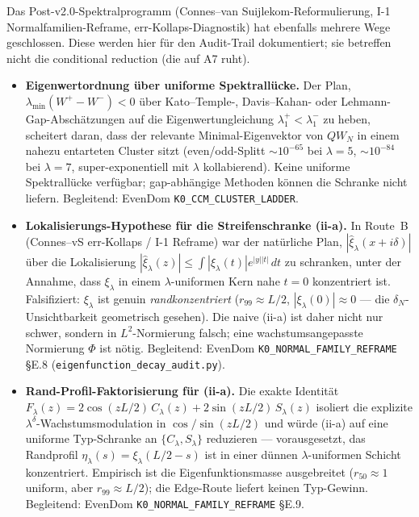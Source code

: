 \documentclass[12pt,a4paper]{article}
\theoremstyle{definition}
\theoremstyle{remark}
\begin{document}
Das Post-v2.0-Spektralprogramm (Connes--van Suijlekom-Reformulierung, I-1 Normalfamilien-Reframe, err-Kollaps-Diagnostik) hat ebenfalls mehrere Wege geschlossen. Diese werden hier für den Audit-Trail dokumentiert; sie betreffen nicht die conditional reduction (die auf A7 ruht).

\begin{itemize}
  \item \textbf{Eigenwertordnung über uniforme Spektrallücke.} Der Plan, $\lambda_{\min}(W^+-W^-)<0$ über Kato--Temple-, Davis--Kahan- oder Lehmann-Gap-Abschätzungen auf die Eigenwertungleichung $\lambda_1^+<\lambda_1^-$ zu heben, scheitert daran, dass der relevante Minimal-Eigenvektor von $QW_N$ in einem nahezu entarteten Cluster sitzt (even/odd-Splitt $\sim\!10^{-65}$ bei $\lambda=5$, $\sim\!10^{-84}$ bei $\lambda=7$, super-exponentiell mit $\lambda$ kollabierend). Keine uniforme Spektrallücke verfügbar; gap-abhängige Methoden können die Schranke nicht liefern. Begleitend: EvenDom \texttt{K0\_CCM\_CLUSTER\_LADDER}.

  \item \textbf{Lokalisierungs-Hypothese für die Streifenschranke (ii-a).} In Route~B (Connes--vS err-Kollaps / I-1 Reframe) war der natürliche Plan, $|\hat\xi_\lambda(x+i\delta)|$ über die Lokalisierung $|\hat\xi_\lambda(z)|\leq\int|\xi_\lambda(t)|e^{|y||t|}\,dt$ zu schranken, unter der Annahme, dass $\xi_\lambda$ in einem $\lambda$-uniformen Kern nahe $t=0$ konzentriert ist. Falsifiziert: $\xi_\lambda$ ist genuin \emph{randkonzentriert} ($r_{99}\approx L/2$, $|\xi_\lambda(0)|\approx 0$ --- die $\delta_N$-Unsichtbarkeit geometrisch gesehen). Die naive (ii-a) ist daher nicht nur schwer, sondern in $L^2$-Normierung falsch; eine wachstumsangepasste Normierung $\Phi$ ist nötig. Begleitend: EvenDom \texttt{K0\_NORMAL\_FAMILY\_REFRAME} \S E.8 (\texttt{eigenfunction\_decay\_audit.py}).

  \item \textbf{Rand-Profil-Faktorisierung für (ii-a).} Die exakte Identität $F_\lambda(z) = 2\cos(zL/2)\,C_\lambda(z) + 2\sin(zL/2)\,S_\lambda(z)$ isoliert die explizite $\lambda^\delta$-Wachstumsmodulation in $\cos/\sin(zL/2)$ und würde (ii-a) auf eine uniforme Typ-Schranke an $\{C_\lambda,S_\lambda\}$ reduzieren --- vorausgesetzt, das Randprofil $\eta_\lambda(s)=\xi_\lambda(L/2-s)$ ist in einer dünnen $\lambda$-uniformen Schicht konzentriert. Empirisch ist die Eigenfunktionsmasse ausgebreitet ($r_{50}\approx 1$ uniform, aber $r_{99}\approx L/2$); die Edge-Route liefert keinen Typ-Gewinn. Begleitend: EvenDom \texttt{K0\_NORMAL\_FAMILY\_REFRAME} \S E.9.


\end{itemize}
\end{document}
